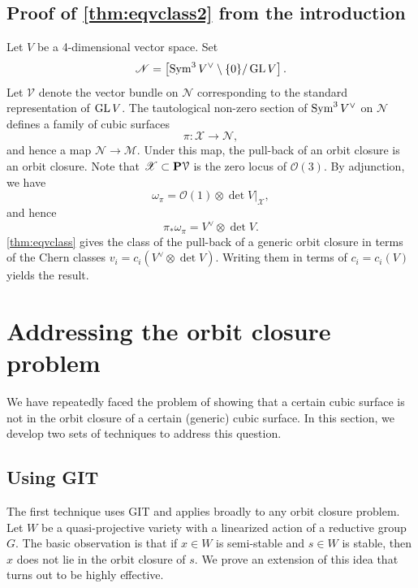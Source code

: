 \documentclass[11pt,reqno, letterpaper]{amsart}
\renewcommand{\to}{{\longrightarrow}}
\numberwithin{equation}{section}
\renewcommand{\O}{\mathcal O}
\begin{document}
\subsection{Proof of \texorpdfstring{\autoref{thm:eqvclass2}}{second theorem} from the introduction}\label{proof:eqvclass2}
Let $V$ be a 4-dimensional vector space.
Set
\[\mathscr N = \left[ \Sym^3V^\vee \setminus \{0\} / \GL V \right]. \]
Let $\mathcal V$ denote the vector bundle on $\mathscr N$ corresponding to the standard representation of $\GL V$.
The tautological non-zero section of $\Sym^3V^\vee$ on $\mathscr N$ defines a family of cubic surfaces
\[ \pi \colon \mathscr X \to \mathscr N,\]
and hence a map $\mathscr N \to \mathscr M$.
Under this map, the pull-back of an orbit closure is an orbit closure.
Note that $\mathscr X \subset \P \mathcal V$ is the zero locus of $\O(3)$.
By adjunction, we have
\[ \omega_\pi = \O(1) \otimes \det V |_{\mathscr X},\]
and hence
\[ \pi_* \omega_\pi = V^\vee \otimes \det V.\]
\autoref{thm:eqvclass} gives the class of the pull-back of a generic orbit closure in terms of the Chern classes $v_i = c_i(V^\vee \otimes \det V)$.
Writing them in terms of $c_i = c_i(V)$ yields the result.

\section{Addressing the orbit closure problem}
\label{sec:orbclosure}
We have repeatedly faced the problem of showing that a certain cubic surface is not in the orbit closure of a certain (generic) cubic surface.
In this section, we develop two sets of techniques to address this question.

\subsection{Using GIT}
The first technique uses GIT and applies broadly to any orbit closure problem.
Let $W$ be a quasi-projective variety with a linearized action of a reductive group $G$.
The basic observation is that if $x \in W$ is semi-stable and $s \in W$ is stable, then $x$ does not lie in the orbit closure of $s$.
We prove an extension of this idea that turns out to be highly effective.
\end{document}
